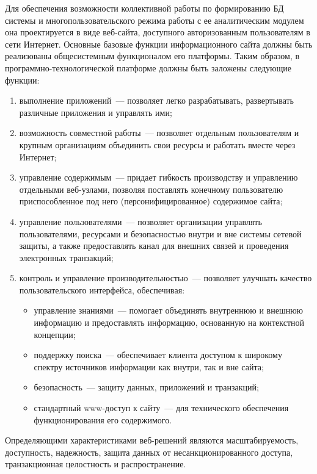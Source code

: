 \begin{multicols}{2}
      Для обеспечения возможности коллективной работы по формированию БД
системы и многопользовательского режима работы с ее аналитическим модулем она 
проектируется в виде веб-сай\-та, доступного авторизованным пользователям в сети Интернет. 
Основные базовые функции информационного сайта должны быть реализованы 
общесистемным функционалом его платформы. 
%
Таким образом, 
в про\-грам\-мно-тех\-но\-ло\-ги\-че\-ской платформе должны быть заложены следующие функции:
      \begin{enumerate}[(1)]
\item выполнение приложений~--- позволяет легко разрабатывать, развертывать различные 
приложения и управлять ими;
\item возможность совместной работы~--- позволяет отдельным пользователям и крупным 
организациям объединить свои ресурсы и работать вместе через Интернет;
\item управление содержимым~--- придает гибкость производству и управлению 
отдельными веб-уз\-ла\-ми, позволяя поставлять конечному пользователю 
приспособленное под него (персонифицированное) содержимое сайта;
\item управление пользователями~--- позволяет организации управлять пользователями, 
ресурсами и безопасностью внутри и вне системы сетевой защиты, а также предоставлять 
канал для внешних связей и проведения электронных транзакций;
\item контроль и управление про\-из\-во\-ди\-тель\-ностью~--- позволяет улучшать качество 
пользовательского интерфейса, обеспечивая:
\begin{itemize}
\item управление знаниями~--- помогает объединять внутреннюю и внешнюю 
информацию и предоставлять информацию, основанную на контекстной 
концепции;
\item поддержку поиска~--- обеспечивает клиента доступом к широкому спектру 
источников информации как внутри, так и вне сайта;
\item безопасность~--- защиту данных, приложений и транзакций;
\item стандартный www-до\-ступ к сайту~--- для технического обеспечения 
функционирования его содержимого.
\end{itemize}
\end{enumerate}
      
      Определяющими характеристиками веб-ре\-шений являются масштабируемость, 
доступность, надежность, защита данных от несанкционированного доступа, транзакционная 
целостность и распространение.
      

\end{multicols}
